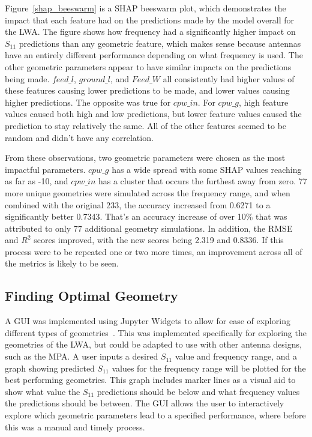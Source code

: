 \documentclass[conference]{IEEEtran}
\begin{document}
Figure~\ref{shap_beeswarm} is a SHAP beeswarm plot, which demonstrates the impact that each feature had on the predictions made by the model overall for the LWA. The figure shows how frequency had a significantly higher impact on $S_{11}$ predictions than any geometric feature, which makes sense because antennas have an entirely different performance depending on what frequency is used. The other geometric parameters appear to have similar impacts on the predictions being made. $feed\_l$, $ground\_l$, and $Feed\_W$ all consistently had higher values of these features causing lower predictions to be made, and lower values causing higher predictions. The opposite was true for $cpw\_in$. For $cpw\_g$, high feature values caused both high and low predictions, but lower feature values caused the prediction to stay relatively the same. All of the other features seemed to be random and didn't have any correlation. 

From these observations, two geometric parameters were chosen as the most impactful parameters. $cpw\_g$ has a wide spread with some SHAP values reaching as far as -10, and $cpw\_in$ has a cluster that occurs the furthest away from zero. 77 more unique geometries were simulated across the frequency range, and when combined with the original 233, the accuracy increased from 0.6271 to a significantly better 0.7343. That's an accuracy increase of over 10\% that was attributed to only 77 additional geometry simulations. In addition, the RMSE and $R^2$ scores improved, with the new scores being 2.319 and 0.8336. If this process were to be repeated one or two more times, an improvement across all of the metrics is likely to be seen. 


\subsection{Finding Optimal Geometry}
A GUI was implemented using Jupyter Widgets to allow for ease of exploring different types of geometries~\cite{interactive_Jupyter_widgets}. This was implemented specifically for exploring the geometries of the LWA, but could be adapted to use with other antenna designs, such as the MPA. A user inputs a desired $S_{11}$ value and frequency range, and a graph showing predicted $S_{11}$ values for the frequency range will be plotted for the best performing geometries. This graph includes marker lines as a visual aid to show what value the $S_{11}$ predictions should be below and what frequency values the predictions should be between. The GUI allows the user to interactively explore which geometric parameters lead to a specified performance, where before this was a manual and timely process.  
\end{document}
